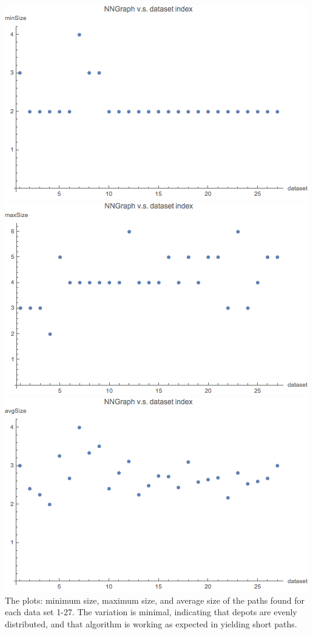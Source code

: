 \documentclass[12pt]{article}  %
\begin{document}
\begin{center}
\includegraphics[scale=0.6]{p1.png}
\includegraphics[scale=0.6]{p2.png}
\includegraphics[scale=0.6]{p3.png}\\
{\footnotesize The plots: minimum size, maximum size, and average size of the paths found for each data set 1-27. The variation is minimal, indicating that depots are evenly distributed, and that algorithm is working as expected in yielding short paths. }
\end{center}
\end{document}
